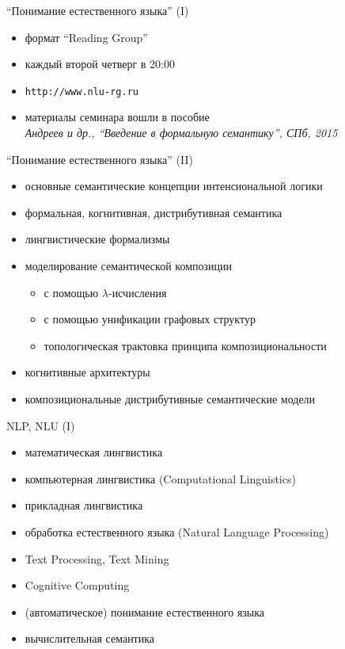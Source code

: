 \documentclass{beamer}
\begin{document}
\begin{frame}{``Понимание естественного языка'' (I)}
\begin{small}
\begin{itemize}
    \item формат ``Reading Group''
    \item каждый второй четверг в 20:00
    \item \texttt{http://www.nlu-rg.ru}
    \item материалы семинара вошли в пособие\\ \textit{Андреев и др., ``Введение в формальную семантику'', СПб, 2015}
\end{itemize}
\end{small}
\end{frame}

\begin{frame}{``Понимание естественного языка'' (II)}
\begin{small}
\begin{itemize}
    \item основные семантические концепции интенсиональной логики
    \item формальная, когнитивная, дистрибутивная семантика
    \item лингвистические формализмы
    \item моделирование семантической композиции
    \begin{itemize}
        \item с помощью $\lambda$-исчисления
        \item с помощью унификации графовых структур
        \item топологическая трактовка принципа композициональности
    \end{itemize}
    \item когнитивные архитектуры
    \item композициональные дистрибутивные семантические модели
\end{itemize}
\end{small}
\end{frame}

\begin{frame}{NLP, NLU (I)}
\begin{small}
\begin{itemize}
        \item математическая лингвистика
        \item компьютерная лингвистика (Computational Linguistics)
        \item прикладная лингвистика
        \item обработка естественного языка (Natural Language Processing)
        \item Text Processing, Text Mining
        \item Cognitive Computing
        \item (автоматическое) понимание естественного языка
        \item вычислительная семантика
\end{itemize}
\end{small}
\end{frame}
\end{document}
